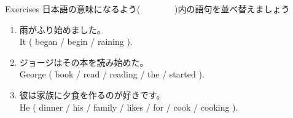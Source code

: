 \documentclass[aspectratio=169,xcolor={dvipsnames,table}]{beamer}
\begin{document}
\begin{frame}[plain]{Exercises}
日本語の意味になるよう(~~~~~~~~)内の語句を並べ替えましょう%
\hfill{\scriptsize {}}
\begin{enumerate}
 \item 雨がふり始めました。\\
       It ( began / begin / raining ).\\
 \item ジョージはその本を読み始めた。\\
       George ( book / read / reading / the / started ).\\
 \item 彼は家族に夕食を作るのが好きです。\\
       He ( dinner / his / family / likes / for / cook / cooking ).\\
\end{enumerate}
\end{frame}
\end{document}
